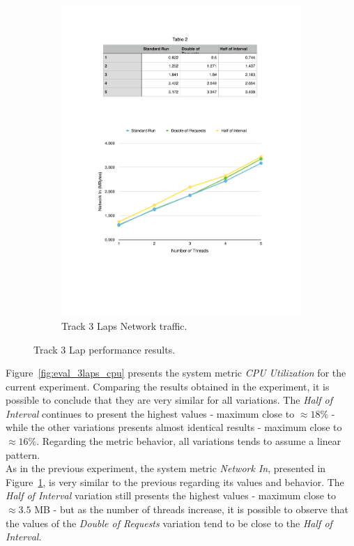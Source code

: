 \begin{figure}[ht!]
\begin{subfigure}{.5\textwidth}
  \includegraphics[width=\linewidth]{./images/network_3_lap}
  \caption{Track 3 Laps Network traffic.}
  \label{fig:eval_3laps_network}
\end{subfigure}
\caption{Track 3 Lap performance results.}
\label{fig:eval_3laps_results}
\end{figure}

Figure~\ref{fig:eval_3laps_cpu} presents the system metric \textit{CPU Utilization} for the current
experiment. Comparing the results obtained in the experiment, it is possible to conclude that
they are very similar for all variations. The \textit{Half of Interval} continues to present
the highest values - maximum close to $\approx18\%$ - while the other variations presents almost identical
results - maximum close to $\approx16\%$. Regarding the metric behavior, all variations tends to assume
a linear pattern.\\

As in the previous experiment, the system metric \textit{Network In}, presented in Figure~\ref{fig:eval_3laps_network},
is very similar to the previous regarding its values and behavior. The \textit{Half of Interval}
variation still presents the highest values - maximum close to $\approx3.5$ \gls{MB} - but as the number of
threads increase, it is possible to observe that the values of the \textit{Double of Requests}
variation tend to be close to the \textit{Half of Interval}.

